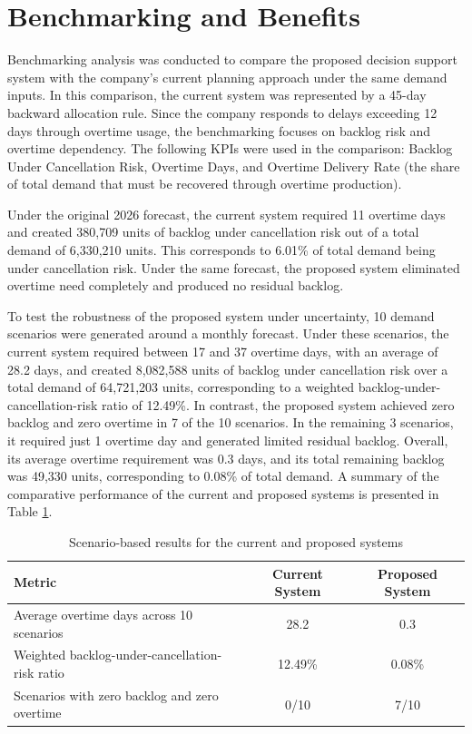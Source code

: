 \documentclass[nocoverpage]{buIE47xbooklet}
\begin{document}
\section{Benchmarking and Benefits}

Benchmarking analysis was conducted to compare the proposed decision support system with the company’s current planning approach under the same demand inputs. In this comparison, the current system was represented by a 45-day backward allocation rule. Since the company responds to delays exceeding 12 days through overtime usage, the benchmarking focuses on backlog risk and overtime dependency. The following KPIs were used in the comparison: Backlog Under Cancellation Risk, Overtime Days, and Overtime Delivery Rate (the share of total demand that must be recovered through overtime production).

Under the original 2026 forecast, the current system required 11 overtime days and created 380,709 units of backlog under cancellation risk out of a total demand of 6,330,210 units. This corresponds to 6.01\% of total demand being under cancellation risk. Under the same forecast, the proposed system eliminated overtime need completely and produced no residual backlog.

To test the robustness of the proposed system under uncertainty, 10 demand scenarios were generated around a monthly forecast. Under these scenarios, the current system required between 17 and 37 overtime days, with an average of 28.2 days, and created 8,082,588 units of backlog under cancellation risk over a total demand of 64,721,203 units, corresponding to a weighted backlog-under-cancellation-risk ratio of 12.49\%. In contrast, the proposed system achieved zero backlog and zero overtime in 7 of the 10 scenarios. In the remaining 3 scenarios, it required just 1 overtime day and generated limited residual backlog. Overall, its average overtime requirement was 0.3 days, and its total remaining backlog was 49,330 units, corresponding to 0.08\% of total demand. A summary of the comparative performance of the current and proposed systems is presented in Table \ref{tab:benchmark_results}.
\begin{table}[h!]
\centering
\caption{Scenario-based results for the current and proposed systems}
\label{tab:benchmark_results}
\renewcommand{\arraystretch}{0.9}
\begin{tabular}{|p{5.8cm}|c|c|}
\hline
\textbf{\footnotesize Metric} & \textbf{\footnotesize Current System} & \textbf{\footnotesize Proposed System} \\ \hline
\footnotesize Average overtime days across 10 scenarios & \footnotesize 28.2 & \footnotesize 0.3 \\ \hline
\footnotesize Weighted backlog-under-cancellation-risk ratio & \footnotesize 12.49\% & \footnotesize 0.08\% \\ \hline
\footnotesize Scenarios with zero backlog and zero overtime & \footnotesize 0/10 & \footnotesize 7/10 \\ \hline
\end{tabular}
\end{table}
\end{document}
